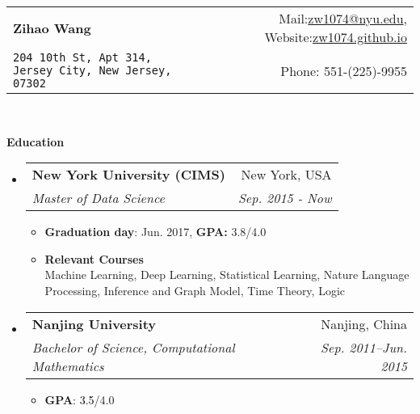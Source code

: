\documentclass[a4paper,10pt]{article}
\makeatletter
\renewcommand{\normalsize}{\fontsize{12pt}{\baselineskip}\selectfont}
\newcommand{\resheading}[1]{{\large \colorbox{mygrey}{\begin{minipage}{\textwidth}{\textbf{#1 \vphantom{p\^{E}}}}\end{minipage}}}}
\newcommand{\ressubheading}[4]{
	\begin{tabular*}{6.5in}{l@{\extracolsep{\fill}}r}
		\textbf{#1} & #2 \\
		\textit{#3} & \textit{#4} \\
	\end{tabular*}\vspace{-6pt}}
\makeatother
\begin{document}
	\footnotesize
	\newcommand{\mywebheader}{
		\begin{tabular*}{7in}{l@{\extracolsep{\fill}}r}
			\textbf{\LARGE Zihao Wang} & Mail:\href{mailto:zw1074@nyu.edu}{zw1074@nyu.edu}, Website:\href{zw1074.github.io}{zw1074.github.io}\\
			{\footnotesize \texttt{204 10th St, Apt 314, Jersey City, New Jersey, 07302}
			}
			& Phone: 551-(225)-9955
		\end{tabular*}
		\\
		\vspace{0.1in}}
	
	\mywebheader
	
	\resheading{Education}
	\begin{itemize}
		\item
		\ressubheading{{\normalsize New York University (CIMS) }}{New York, USA}{\normalsize Master of Data Science}{Sep. 2015 - Now}
		\begin{itemize}
			\item {\bfseries Graduation day}: Jun. 2017, {\bfseries GPA:} 3.8/4.0
			\item {\bfseries Relevant Courses}\\
			{\footnotesize
				Machine Learning, Deep Learning, Statistical Learning, Nature Language Processing, Inference and Graph Model, Time Theory, Logic
			}
		\end{itemize}
		\item
		\ressubheading{{\normalsize Nanjing University}}{Nanjing, China}{{\normalsize Bachelor of Science, Computational Mathematics}}{Sep. 2011--Jun. 2015}
		\begin{itemize}
			\item {\bfseries GPA}: \textcolor{black}{3.5}/4.0
		\end{itemize}
	\end{itemize}
	
\end{document}
